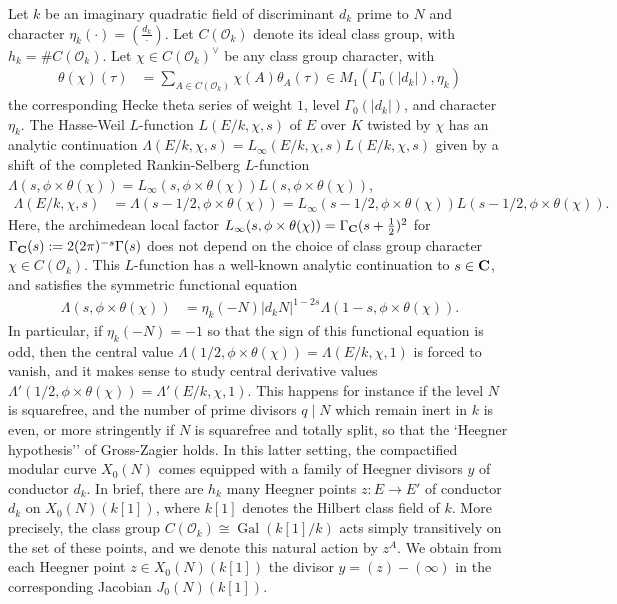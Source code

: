 \documentclass{amsart}
\theoremstyle{definition}
\theoremstyle{definition}
\theoremstyle{definition}
\begin{document}
Let $k$ be an imaginary quadratic field of discriminant $d_k$ prime to $N$ and character $\eta_k(\cdot) = (\frac{d_k}{\cdot})$.
Let $C(\mathcal{O}_k)$ denote its ideal class group, with $h_k = \# C(\mathcal{O}_k)$. Let $\chi \in C(\mathcal{O}_k)^{\vee}$ be any class group character, with
\begin{align*} \theta(\chi)(\tau) &= \sum\limits_{A \in C(\mathcal{O}_k)} \chi(A) \theta_A(\tau) \in M_1(\Gamma_0(\vert d_k \vert), \eta_k) \end{align*} 
the corresponding Hecke theta series of weight $1$, level $\Gamma_0(\vert d_k \vert)$, and character $\eta_k$. 
The Hasse-Weil $L$-function $L(E/k, \chi, s)$ of $E$ over $K$ twisted by $\chi$ has an analytic continuation 
$\Lambda(E/k, \chi, s) = L_{\infty}(E/k, \chi, s) L(E/k, \chi, s)$ given
by a shift of the completed Rankin-Selberg $L$-function $\Lambda(s, \phi \times \theta(\chi)) = L_{\infty}(s, \phi \times \theta(\chi)) L(s, \phi \times \theta(\chi))$,
\begin{align*} \Lambda(E/k, \chi, s) &= \Lambda(s-1/2, \phi \times \theta(\chi)) = L_{\infty}(s-1/2, \phi \times \theta(\chi)) L(s-1/2, \phi \times \theta(\chi)). \end{align*}
Here, the archimedean local factor $L_{\infty}(s, \phi \times \theta(\chi)) =  \Gamma_{\bf{C}}( s+\frac{1}{2} )^2$ for $\Gamma_{\bf{C}}(s) := 2(2\pi)^{-s} \Gamma(s)$
does not depend on the choice of class group character $\chi \in C(\mathcal{O}_k)$.
This $L$-function has a well-known analytic continuation to $s \in {\bf{C}}$, and satisfies the symmetric functional equation
\begin{align*} \Lambda(s, \phi \times \theta(\chi)) &= \eta_k(-N) \vert d_k N \vert^{1-2s} \Lambda(1-s, \phi \times \theta(\chi)). \end{align*}
In particular, if $\eta_k(-N) = -1$ so that the sign of this functional equation is odd, 
then the central value $\Lambda(1/2, \phi \times \theta(\chi)) = \Lambda(E/k, \chi, 1)$ is forced to vanish, 
and it makes sense to study central derivative values $\Lambda'(1/2, \phi \times \theta(\chi)) = \Lambda'(E/k, \chi, 1)$. 
This happens for instance if the level $N$ is squarefree, and the number of prime divisors $q \mid N$ which remain inert in $k$ %
is even, or more stringently if $N$ is squarefree and totally split, so that the `Heegner hypothesis'' of Gross-Zagier \cite{GZ} holds. 
In this latter setting, the compactified modular curve $X_0(N)$ comes equipped with a family of Heegner divisors $y$ of conductor $d_k$. 
In brief, there are $h_k$ many Heegner points $z: E \rightarrow E'$ of conductor 
$d_k$ on $X_0(N)(k[1])$, where $k[1]$ denotes the Hilbert class field of $k$. More precisely, the class group 
$C(\mathcal{O}_k) \cong \operatorname{Gal}(k[1]/k)$ acts simply transitively on the set of these points, and we denote this natural action by $z^A$.
We obtain from each Heegner point $z \in X_0(N)(k[1])$ the divisor $y = (z) - (\infty)$ in the corresponding Jacobian $J_0(N)(k[1])$. 
  
\end{document}
